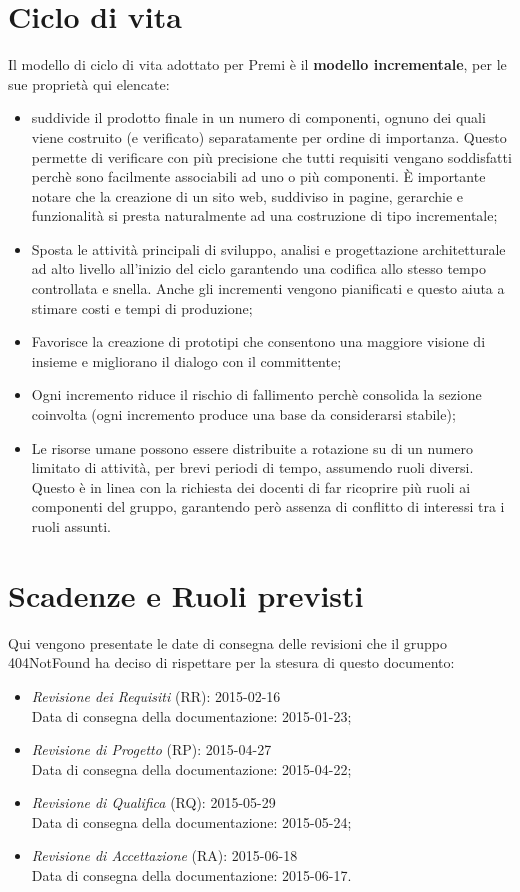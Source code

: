 \newpage
\section{Ciclo di vita}
Il modello di ciclo di vita adottato per Premi è il \textbf{modello incrementale}, per le sue proprietà qui elencate:

\begin{itemize}
	\item suddivide il prodotto finale in un numero di componenti, ognuno dei quali viene costruito (e verificato) separatamente per ordine di importanza. Questo permette di verificare con più precisione che tutti requisiti vengano soddisfatti perchè sono facilmente associabili ad uno o più componenti. È importante notare che la creazione di un sito web, suddiviso in pagine, gerarchie e funzionalità si presta naturalmente ad una costruzione di tipo incrementale;
	\item Sposta le attività principali di sviluppo, analisi e progettazione architetturale ad alto livello all'inizio del ciclo garantendo una codifica allo stesso tempo controllata e snella. Anche gli incrementi vengono pianificati e questo aiuta a stimare costi e tempi di produzione;
	\item Favorisce la creazione di prototipi che consentono una maggiore visione di insieme e migliorano il dialogo con il committente;
	\item Ogni incremento riduce il rischio di fallimento perchè consolida la sezione coinvolta (ogni incremento produce una base da considerarsi stabile);
	\item Le risorse umane possono essere distribuite a rotazione su di un numero limitato di attività, per brevi periodi di tempo, assumendo ruoli diversi. Questo è in linea con la richiesta dei docenti di far ricoprire più ruoli ai componenti del gruppo, garantendo però assenza di conflitto di interessi tra i ruoli assunti.
\end{itemize}	

\section{Scadenze e Ruoli previsti}
Qui vengono presentate le date di consegna delle revisioni che il gruppo 404NotFound ha deciso di rispettare per la stesura di questo documento:

\begin{itemize}
	\item \textit{Revisione dei Requisiti} (RR): 2015-02-16 \\
	Data di consegna della documentazione: 2015-01-23;
	\item \textit{Revisione di Progetto} (RP): 2015-04-27 \\
	Data di consegna della documentazione: 2015-04-22;
	\item \textit{Revisione di Qualifica} (RQ): 2015-05-29 \\
	Data di consegna della documentazione: 2015-05-24;
	\item \textit{Revisione di Accettazione} (RA): 2015-06-18 \\
	Data di consegna della documentazione: 2015-06-17.
\end{itemize}

